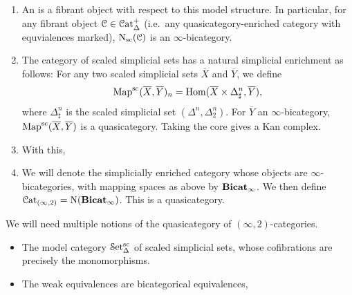 \documentclass[main.tex]{subfiles}
\begin{document}
\begin{enumerate}
  \item An  is a fibrant object with respect to this model structure. In particular, for any fibrant object $\mathcal{C} \in \mathcal{C}\mathrm{at}_{\Delta}^{+}$ (i.e.\ any quasicategory-enriched category with equvialences marked), $\mathrm{N}_{\mathrm{sc}}(\mathcal{C})$ is an $\infty$-bicategory.

  \item The category of scaled simplicial sets has a natural simplicial enrichment as follows: For any two scaled simplicial sets $\overline{X}$ and $\overline{Y}$, we define
    \begin{equation*}
      \mathrm{Map}^{\mathrm{sc}}(\overline{X}, \overline{Y})_{n} = \mathrm{Hom}(\overline{X} \times \Delta^{n}_{\sharp}, \overline{Y}),
    \end{equation*}
    where $\Delta^{n}_{\sharp}$ is the scaled simplicial set $(\Delta^{n}, \Delta^{n}_{2})$. For $\overline{Y}$ an $\infty$-bicategory, $\mathrm{Map}^{\mathrm{sc}}(\overline{X}, \overline{Y})$ is a quasicategory. Taking the core gives a Kan complex.

  \item With this,

  \item We will denote the simplicially enriched category whose objects are $\infty$-bicategories, with mapping spaces as above by $\mathbf{Bicat}_{\infty}$. We then define $\mathcal{C}\mathrm{at}_{(\infty, 2)} = \mathrm{N}(\mathbf{Bicat}_{\infty})$. This is a quasicategory.
\end{enumerate}

We will need multiple notions of the quasicategory of $(\infty,2)$-categories.
\begin{itemize}
  \item The model category $\mathcal{S}\mathrm{et}_{\Delta}^{\mathrm{sc}}$ of scaled simplicial sets, whose cofibrations are precisely the monomorphisms.

  \item The weak equivalences are bicategorical equivalences,
\end{itemize}
\end{document}
